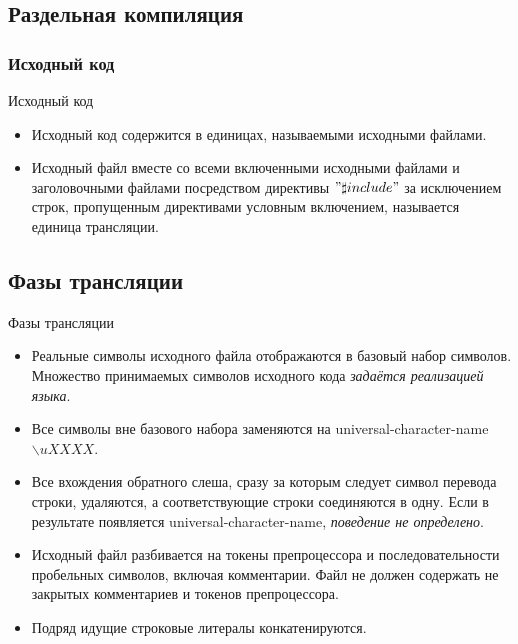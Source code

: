     \subsection{Раздельная компиляция}
    \subsubsection{Исходный код}
    \begin{frame}{Исходный код}
        \begin{itemize}
            \item Исходный код содержится в единицах, называемыми исходными файлами.
            \item Исходный файл вместе со всеми включенными исходными файлами и заголовочными файлами посредством директивы $"\sharp{include}"$
                за исключением строк, пропущенным директивами условным включением, называется единица трансляции.
        \end{itemize}
    \end{frame}
    \subsection{Фазы трансляции}
    \begin{frame}{Фазы трансляции}
        \begin{itemize}
            \item Реальные символы исходного файла отображаются в базовый набор символов.
                Множество принимаемых символов исходного кода \textit{задаётся реализацией языка}.
            \item Все символы вне базового набора заменяются на universal-character-name $\backslash{uXXXX}$.
            \item Все вхождения обратного слеша, сразу за которым следует символ перевода строки,
                удаляются, а соответствующие строки соединяются в одну. Если в результате появляется
                universal-character-name, \textit{поведение не определено}.
            \item Исходный файл разбивается на токены препроцессора и последовательности
                пробельных символов, включая комментарии. Файл не должен содержать не закрытых комментариев и
                токенов препроцессора.
            \item Подряд идущие строковые литералы конкатенируются.
        \end{itemize}
    \end{frame}
